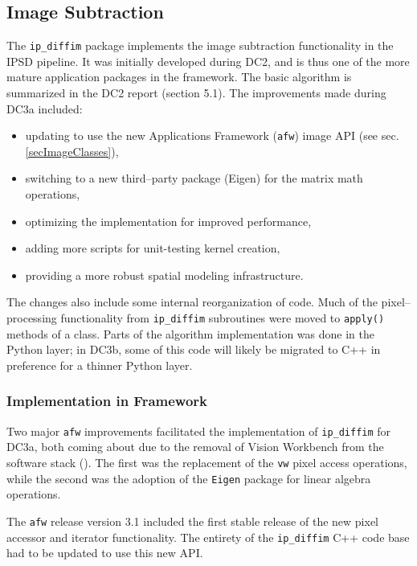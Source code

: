 
\subsection{Image Subtraction}

The {\tt ip\_diffim} package implements the image subtraction
functionality in the IPSD pipeline.  It was initially developed during
DC2, and is thus one of the more mature application packages in the
framework.  The basic algorithm is summarized in the DC2 report
(section 5.1).  The improvements made during DC3a included: 
\begin{itemize}
\item updating to use the new Applications Framework ({\tt afw}) image
  API (see sec. \ref{secImageClasses}),
\item switching to a new third--party package (Eigen) for the matrix
  math operations,
\item optimizing the implementation for improved performance,
\item adding more scripts for unit-testing kernel creation, 
\item providing a more robust spatial modeling infrastructure. 
\end{itemize}

The changes also include some internal reorganization of code.  Much
of the pixel--processing functionality from {\tt ip\_diffim}
subroutines were moved to {\tt apply()} methods of a class.  Parts of
the algorithm implementation was done in the Python layer; in DC3b,
some of this code will likely be migrated to C++ in preference for a
thinner Python layer. 

\subsubsection{Implementation in Framework}

Two major {\tt afw} improvements facilitated the implementation of
{\tt ip\_diffim} for DC3a, both coming about due to the removal of
Vision Workbench from the software stack ().  The first was the
replacement of the {\tt vw} pixel access operations, while the second
was the adoption of the {\tt Eigen} package for linear algebra
operations.  

The {\tt afw} release version 3.1 included the first stable release of
the new pixel accessor and iterator functionality.  The entirety of
the {\tt ip\_diffim} C++ code base had to be updated to use this new
API.

